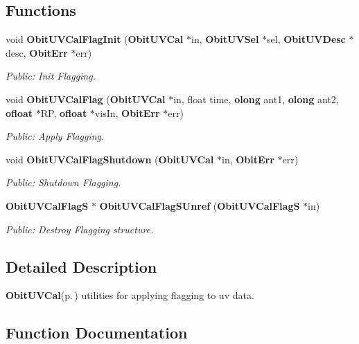 \subsection*{Functions}
\begin{CompactItemize}
\item 
void {\bf Obit\-UVCal\-Flag\-Init} ({\bf Obit\-UVCal} $\ast$in, {\bf Obit\-UVSel} $\ast$sel, {\bf Obit\-UVDesc} $\ast$desc, {\bf Obit\-Err} $\ast$err)
\begin{CompactList}\small\item\em Public: Init Flagging. \item\end{CompactList}\item 
void {\bf Obit\-UVCal\-Flag} ({\bf Obit\-UVCal} $\ast$in, float time, {\bf olong} ant1, {\bf olong} ant2, {\bf ofloat} $\ast$RP, {\bf ofloat} $\ast$vis\-In, {\bf Obit\-Err} $\ast$err)
\begin{CompactList}\small\item\em Public: Apply Flagging. \item\end{CompactList}\item 
void {\bf Obit\-UVCal\-Flag\-Shutdown} ({\bf Obit\-UVCal} $\ast$in, {\bf Obit\-Err} $\ast$err)
\begin{CompactList}\small\item\em Public: Shutdown Flagging. \item\end{CompactList}\item 
{\bf Obit\-UVCal\-Flag\-S} $\ast$ {\bf Obit\-UVCal\-Flag\-SUnref} ({\bf Obit\-UVCal\-Flag\-S} $\ast$in)
\begin{CompactList}\small\item\em Public: Destroy Flagging structure. \item\end{CompactList}\end{CompactItemize}


\subsection{Detailed Description}
{\bf Obit\-UVCal}{\rm (p.\,\pageref{structObitUVCal})} utilities for applying flagging to uv data. 



\subsection{Function Documentation}
